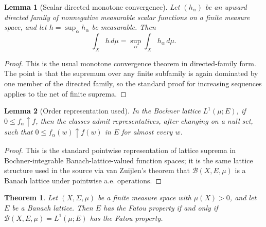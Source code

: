 \documentclass[11pt]{article}
\newtheorem*{theorem}{Theorem}
\newtheorem*{lemma}{Lemma}
\newcommand{\B}{\mathcal B}
\begin{document}
\begin{lemma}[Scalar directed monotone convergence]
Let $(h_\alpha)$ be an upward directed family of nonnegative measurable scalar
functions on a finite measure space, and let $h=\sup_\alpha h_\alpha$ be
measurable.  Then
\[
  \int_X h\,d\mu=\sup_\alpha \int_X h_\alpha\,d\mu .
\]
\end{lemma}

\begin{proof}
This is the usual monotone convergence theorem in directed-family form.  The
point is that the supremum over any finite subfamily is again dominated by
one member of the directed family, so the standard proof for increasing
sequences applies to the net of finite suprema.
\end{proof}

\begin{lemma}[Order representation used]
In the Bochner lattice $L^1(\mu;E)$, if $0\leq f_\alpha\uparrow f$, then the
classes admit representatives, after changing on a null set, such that
$0\leq f_\alpha(w)\uparrow f(w)$ in $E$ for almost every $w$.
\end{lemma}

\begin{proof}
This is the standard pointwise representation of lattice suprema in
Bochner-integrable Banach-lattice-valued function spaces; it is the same
lattice structure used in the source via van Zuijlen's theorem that
$\B(X,E,\mu)$ is a Banach lattice under pointwise a.e. operations.
\end{proof}

\begin{theorem}
Let $(X,\Sigma,\mu)$ be a finite measure space with $\mu(X)>0$, and let $E$ be
a Banach lattice.  Then $E$ has the Fatou property if and only if
$\B(X,E,\mu)=L^1(\mu;E)$ has the Fatou property.
\end{theorem}
\end{document}
